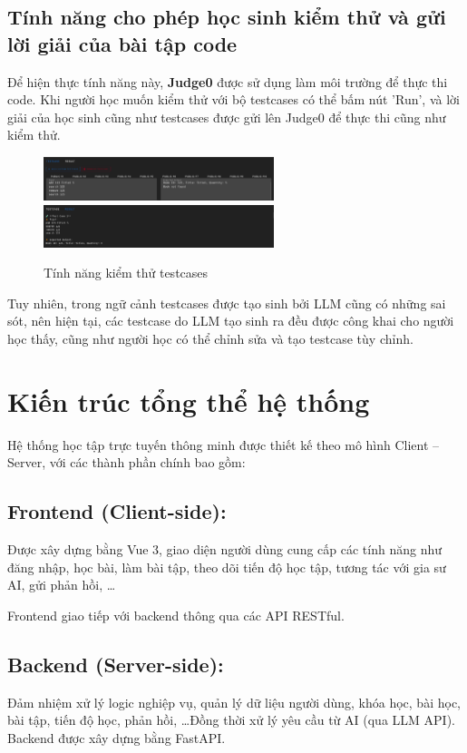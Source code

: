 \subsection{Tính năng cho phép học sinh kiểm thử và gửi lời giải của bài tập code}

Để hiện thực tính năng này, \textbf{Judge0} được sử dụng làm môi trường để thực thi code. Khi người học muốn kiểm thử với bộ testcases có thể bấm nút 'Run', và lời giải của học sinh cũng như testcases được gửi lên Judge0 để thực thi cũng như kiểm thử.

\begin{figure}[H]
\centering
    \includegraphics[width=0.6\textwidth]{images/code_exercise_testcase.png}
    \includegraphics[width=0.6\textwidth]{images/code_exercise_testcase_result.png}
    \caption{Tính năng kiểm thử testcases}
\end{figure}

Tuy nhiên, trong ngữ cảnh testcases được tạo sinh bởi LLM cũng có những sai sót, nên hiện tại, các testcase do LLM tạo sinh ra đều được công khai cho người học thấy, cũng như người học có thể chỉnh sửa và tạo testcase tùy chỉnh.

\section{Kiến trúc tổng thể hệ thống}
Hệ thống học tập trực tuyến thông minh được thiết kế theo mô hình Client – Server, với các thành phần chính bao gồm:

\subsection{Frontend (Client-side):}
Được xây dựng bằng Vue 3, giao diện người dùng cung cấp các tính năng như đăng nhập, học bài, làm bài tập, theo dõi tiến độ học tập, tương tác với gia sư AI, gửi phản hồi, \dots

Frontend giao tiếp với backend thông qua các API RESTful.

\subsection{Backend (Server-side):}
Đảm nhiệm xử lý logic nghiệp vụ, quản lý dữ liệu người dùng, khóa học, bài học, bài tập, tiến độ học, phản hồi, \dots Đồng thời xử lý yêu cầu từ AI (qua LLM API).
Backend được xây dựng bằng FastAPI. 

